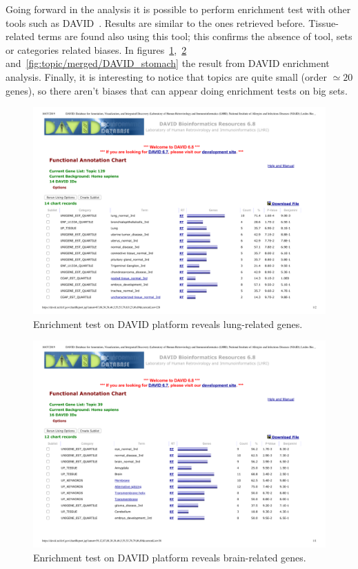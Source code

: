 Going forward in the analysis it is possible to perform enrichment test with other tools such as DAVID~\cite{huang2008bioinformatics,huang2009systematic}. Results are similar to the ones retrieved before. Tissue-related terms are found also using this tool; this confirms the absence of tool, sets or categories related biases. In figures~\ref{fig:topic/merged/DAVID_lung},~\ref{fig:topic/merged/DAVID_brain} and~\ref{fig:topic/merged/DAVID_stomach} the result from DAVID enrichment analysis. Finally, it is interesting to notice that topics are quite small (order $\simeq20$ genes), so there aren't biases that can appear doing enrichment tests on big sets.
\begin{figure}[htb!]
    \centering
    \includegraphics[width=0.8\linewidth]{pictures/topic/merged/DAVID_lung.pdf}
    \caption{Enrichment test on DAVID platform reveals lung-related genes.}
    \label{fig:topic/merged/DAVID_lung}
\end{figure}
\begin{figure}[htb!]
    \centering
    \includegraphics[width=0.8\linewidth]{pictures/topic/merged/DAVID_brain.pdf}
    \caption{Enrichment test on DAVID platform reveals brain-related genes.}
    \label{fig:topic/merged/DAVID_brain}
\end{figure}
